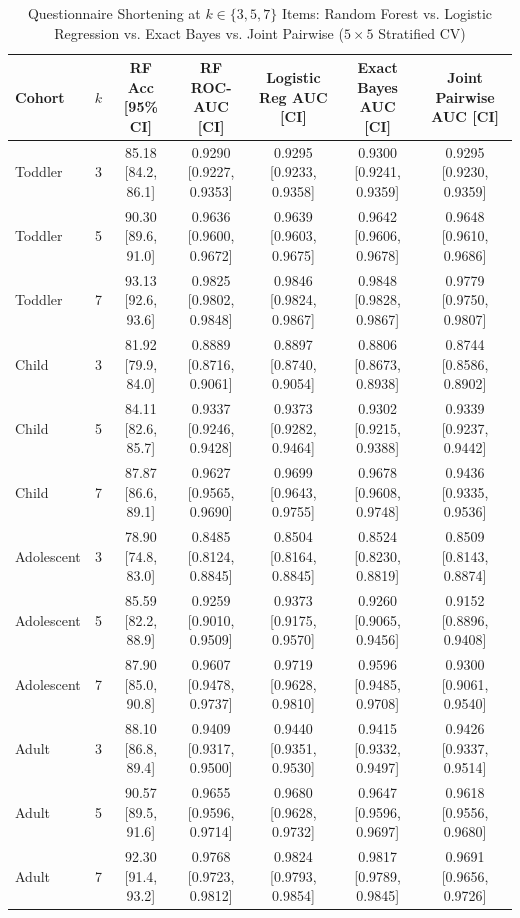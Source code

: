 \documentclass[conference]{IEEEtran}
\begin{document}
\begin{table}[t]
\centering
\caption{Questionnaire Shortening at $k \in \{3, 5, 7\}$ Items: Random Forest vs. Logistic Regression vs. Exact Bayes vs. Joint Pairwise ($5\times 5$ Stratified CV)}
\label{tab:shortening}
\footnotesize
\setlength{\tabcolsep}{3pt}
\begin{tabular*}{\textwidth}{|@{\extracolsep{\fill}}l|c|c|c|c|c|c|}
\hline
\textbf{Cohort} & $k$ & \textbf{RF Acc [95\% CI]} & \textbf{RF ROC-AUC [CI]} & \textbf{Logistic Reg AUC [CI]} & \textbf{Exact Bayes AUC [CI]} & \textbf{Joint Pairwise AUC [CI]} \\
\hline
Toddler & 3 & 85.18 [84.2, 86.1] & 0.9290 [0.9227, 0.9353] & 0.9295 [0.9233, 0.9358] & 0.9300 [0.9241, 0.9359] & 0.9295 [0.9230, 0.9359] \\
\hline
Toddler & 5 & 90.30 [89.6, 91.0] & 0.9636 [0.9600, 0.9672] & 0.9639 [0.9603, 0.9675] & 0.9642 [0.9606, 0.9678] & 0.9648 [0.9610, 0.9686] \\
\hline
Toddler & 7 & 93.13 [92.6, 93.6] & 0.9825 [0.9802, 0.9848] & 0.9846 [0.9824, 0.9867] & 0.9848 [0.9828, 0.9867] & 0.9779 [0.9750, 0.9807] \\
\hline
Child & 3 & 81.92 [79.9, 84.0] & 0.8889 [0.8716, 0.9061] & 0.8897 [0.8740, 0.9054] & 0.8806 [0.8673, 0.8938] & 0.8744 [0.8586, 0.8902] \\
\hline
Child & 5 & 84.11 [82.6, 85.7] & 0.9337 [0.9246, 0.9428] & 0.9373 [0.9282, 0.9464] & 0.9302 [0.9215, 0.9388] & 0.9339 [0.9237, 0.9442] \\
\hline
Child & 7 & 87.87 [86.6, 89.1] & 0.9627 [0.9565, 0.9690] & 0.9699 [0.9643, 0.9755] & 0.9678 [0.9608, 0.9748] & 0.9436 [0.9335, 0.9536] \\
\hline
Adolescent & 3 & 78.90 [74.8, 83.0] & 0.8485 [0.8124, 0.8845] & 0.8504 [0.8164, 0.8845] & 0.8524 [0.8230, 0.8819] & 0.8509 [0.8143, 0.8874] \\
\hline
Adolescent & 5 & 85.59 [82.2, 88.9] & 0.9259 [0.9010, 0.9509] & 0.9373 [0.9175, 0.9570] & 0.9260 [0.9065, 0.9456] & 0.9152 [0.8896, 0.9408] \\
\hline
Adolescent & 7 & 87.90 [85.0, 90.8] & 0.9607 [0.9478, 0.9737] & 0.9719 [0.9628, 0.9810] & 0.9596 [0.9485, 0.9708] & 0.9300 [0.9061, 0.9540] \\
\hline
Adult & 3 & 88.10 [86.8, 89.4] & 0.9409 [0.9317, 0.9500] & 0.9440 [0.9351, 0.9530] & 0.9415 [0.9332, 0.9497] & 0.9426 [0.9337, 0.9514] \\
\hline
Adult & 5 & 90.57 [89.5, 91.6] & 0.9655 [0.9596, 0.9714] & 0.9680 [0.9628, 0.9732] & 0.9647 [0.9596, 0.9697] & 0.9618 [0.9556, 0.9680] \\
\hline
Adult & 7 & 92.30 [91.4, 93.2] & 0.9768 [0.9723, 0.9812] & 0.9824 [0.9793, 0.9854] & 0.9817 [0.9789, 0.9845] & 0.9691 [0.9656, 0.9726] \\
\hline
\end{tabular*}
\vspace{-2mm}
\end{table}
\end{document}
